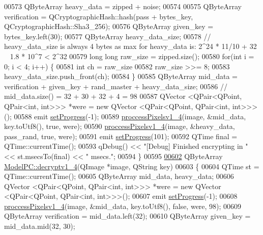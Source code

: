 \begin{DoxyCode}
00573     QByteArray heavy\_data = zipped + noise;
00574 
00575     QByteArray verification = QCryptographicHash::hash(pass + bytes\_key, QCryptographicHash::Sha3\_256);
00576     QByteArray given\_key = bytes\_key.left(30);
00577     QByteArray heavy\_data\_size;
00578     \textcolor{comment}{// heavy\_data\_size is always 4 bytes as max for heavy\_data is: 2^24 * 11/10 + 32 ~ 1.8 * 10^7 < 2^32}
00579     \textcolor{keywordtype}{long} \textcolor{keywordtype}{long} raw\_size = zipped.size();
00580     \textcolor{keywordflow}{for}(\textcolor{keywordtype}{int} i = 0; i < 4; i++) \{
00581         \textcolor{keywordtype}{int} ch = raw\_size %
00582         raw\_size >>= 8;
00583         heavy\_data\_size.push\_front(ch);
00584     \}
00585     QByteArray mid\_data = verification + given\_key + rand\_master + heavy\_data\_size;
00586     \textcolor{comment}{// mid\_data.size() = 32 + 30 + 32 + 4 = 98}
00587     QVector <QPair<QPoint, QPair<int, int>>> *were = \textcolor{keyword}{new} QVector <QPair<QPoint, QPair<int, int>>>();
00588     emit \hyperlink{class_model_p_c_afdcd80f0ed5062e145a71f09b0897547}{setProgress}(-1);
00589     \hyperlink{class_model_p_c_a5cdb4d1d61ff62ee9d45b496a7dbf1fb}{proccessPixelsv1\_4}(image, &mid\_data, key.toUtf8(), \textcolor{keyword}{true}, were);
00590     \hyperlink{class_model_p_c_a5cdb4d1d61ff62ee9d45b496a7dbf1fb}{proccessPixelsv1\_4}(image, &heavy\_data, pass\_rand, \textcolor{keyword}{true}, were);
00591     emit \hyperlink{class_model_p_c_afdcd80f0ed5062e145a71f09b0897547}{setProgress}(101);
00592     QTime \textcolor{keyword}{final} = QTime::currentTime();
00593     qDebug() << \textcolor{stringliteral}{"[Debug] Finished encrypting in "} << st.msecsTo(\textcolor{keyword}{final}) << \textcolor{stringliteral}{" msecs."};
00594 \}
00595 
\hypertarget{modelpc_8cpp_source.tex_l00602}{}\hyperlink{class_model_p_c_a7a1f7d491e1bde16936190b9e90896b0}{00602} QByteArray \hyperlink{class_model_p_c_a7a1f7d491e1bde16936190b9e90896b0}{ModelPC::decryptv1\_4}(QImage *image, QString key)
00603 \{
00604     QTime st = QTime::currentTime();
00605     QByteArray mid\_data, heavy\_data;
00606     QVector <QPair<QPoint, QPair<int, int>>> *were = \textcolor{keyword}{new} QVector <QPair<QPoint, QPair<int, int>>>();
00607     emit \hyperlink{class_model_p_c_afdcd80f0ed5062e145a71f09b0897547}{setProgress}(-1);
00608     \hyperlink{class_model_p_c_a5cdb4d1d61ff62ee9d45b496a7dbf1fb}{proccessPixelsv1\_4}(image, &mid\_data, key.toUtf8(), \textcolor{keyword}{false}, were, 98);
00609     QByteArray verification = mid\_data.left(32);
00610     QByteArray given\_key = mid\_data.mid(32, 30);

\end{DoxyCode}
